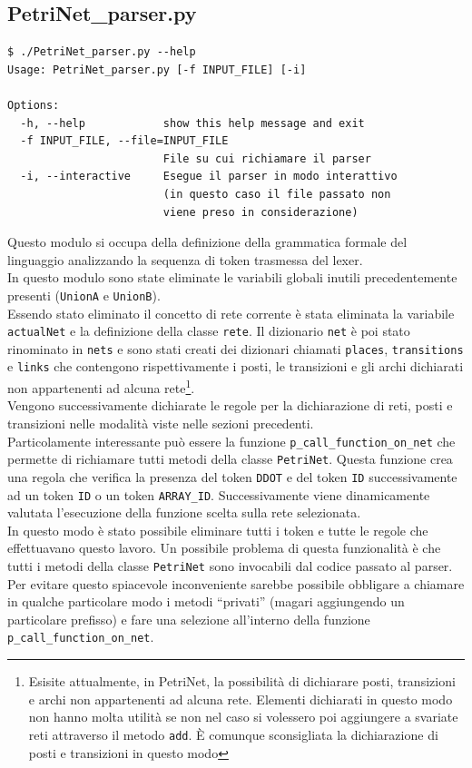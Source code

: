 \documentclass[italian,12pt]{book}
\begin{document}
\subsection{PetriNet\_parser.py}
\begin{verbatim}
$ ./PetriNet_parser.py --help
Usage: PetriNet_parser.py [-f INPUT_FILE] [-i] 

Options:
  -h, --help            show this help message and exit
  -f INPUT_FILE, --file=INPUT_FILE
                        File su cui richiamare il parser
  -i, --interactive     Esegue il parser in modo interattivo 
                        (in questo caso il file passato non 
                        viene preso in considerazione)
\end{verbatim}
Questo modulo si occupa della definizione della grammatica formale del linguaggio analizzando la sequenza di token trasmessa del lexer.\\
In questo modulo sono state eliminate le variabili globali inutili precedentemente presenti ({\tt UnionA} e {\tt UnionB}).\\
Essendo stato eliminato il concetto di rete corrente è stata eliminata la variabile {\tt actualNet} e la definizione della classe {\tt rete}. Il dizionario {\tt net} è poi stato rinominato in {\tt nets} e sono stati creati dei dizionari chiamati {\tt places}, {\tt transitions} e {\tt links} che contengono rispettivamente i posti, le transizioni e gli archi dichiarati non appartenenti ad alcuna rete\footnote{Esisite attualmente, in PetriNet, la possibilità di dichiarare posti, transizioni e archi non appartenenti ad alcuna rete. Elementi dichiarati in questo modo non hanno molta utilità se non nel caso si volessero poi aggiungere a svariate reti attraverso il metodo {\tt  add}. È comunque sconsigliata la dichiarazione di posti e transizioni in questo modo}.\\
Vengono successivamente dichiarate le regole per la dichiarazione di reti, posti e transizioni nelle modalità viste nelle sezioni precedenti.\\
Particolamente interessante può essere la funzione {\tt p\_call\_function\_on\_net} che permette di richiamare tutti metodi della classe {\tt PetriNet}. Questa funzione crea una regola che verifica la presenza del token {\tt DDOT} e del token {\tt ID} successivamente ad un token {\tt ID} o un token {\tt ARRAY\_ID}. Successivamente viene dinamicamente valutata l'esecuzione della funzione scelta sulla rete selezionata. \\
In questo modo è stato possibile eliminare tutti i token e tutte le regole che effettuavano questo lavoro. Un possibile problema di questa funzionalità è che tutti i metodi della classe {\tt PetriNet} sono invocabili dal codice passato al parser. Per evitare questo spiacevole inconveniente sarebbe possibile obbligare a chiamare in qualche particolare modo i metodi ``privati'' (magari aggiungendo un particolare prefisso) e fare una selezione all'interno della funzione {\tt p\_call\_function\_on\_net}.\\
\end{document}
